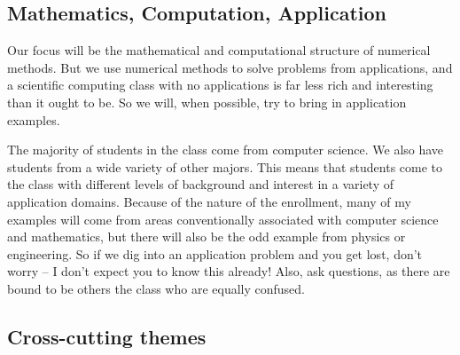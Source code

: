 \documentclass[12pt, leqno]{article}
\begin{document}
\subsection{Mathematics, Computation, Application}

Our focus will be the mathematical and computational structure of
numerical methods.  But we use numerical methods to solve
problems from applications, and a scientific computing class with
no applications is far less rich and interesting than it ought to be.
So we will, when possible, try to bring in application examples.

The majority of students in the class come from computer science.  We
also have students from a wide variety of other majors.  This means
that students come to the class with different levels of background
and interest in a variety of application domains.  Because of the
nature of the enrollment, many of my examples will come from areas
conventionally associated with computer science and mathematics, but
there will also be the odd example from physics or engineering.  So if
we dig into an application problem and you get lost, don't worry -- I
don't expect you to know this already!  Also, ask questions, as there
are bound to be others the class who are equally confused.

\subsection{Cross-cutting themes}
\end{document}
